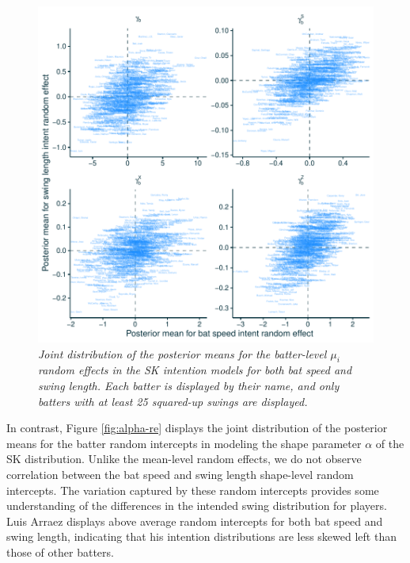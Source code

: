 \documentclass{article}
\begin{document}
      \begin{figure}[H]
        \centering
        \includegraphics[width = \textwidth]{../../figures/intent_re.pdf}
        \caption{\it Joint distribution of the posterior means for the batter-level $\mu_i$ random effects in the SK intention models for both bat speed and swing length. Each batter is displayed by their name, and only batters with at least 25 squared-up swings are displayed.}
        \label{fig:intent-re}
      \end{figure}
        
       In contrast, Figure \ref{fig:alpha-re} displays the joint distribution of the posterior means for the batter random intercepts in modeling the shape parameter $\alpha$ of the SK distribution. Unlike the mean-level random effects, we do not observe correlation between the bat speed and swing length shape-level random intercepts. The variation captured by these random intercepts provides some understanding of the differences in the intended swing distribution for players. Luis Arraez displays above average random intercepts for both bat speed and swing length, indicating that his intention distributions are less skewed left than those of other batters. 
                
\end{document}
